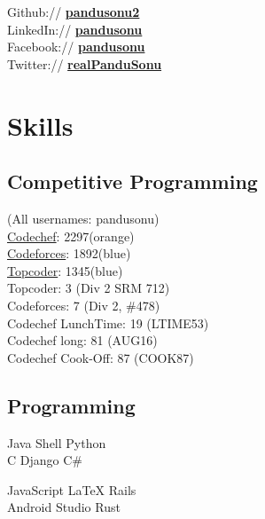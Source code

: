 \documentclass[letterpaper]{deedy-resume} %
\begin{document}
\begin{minipage}[t]{0.33\textwidth}
Github:// \href{https://github.com/pandusonu2}{\bf pandusonu2} \\
LinkedIn:// \href{https://www.linkedin.com/in/pandusonu}{\bf pandusonu} \\
Facebook:// \href{https://www.facebook.com/pandu.sonu}{\bf pandusonu} \\
Twitter:// \href{https://twitter.com/realPanduSonu} {\bf realPanduSonu}

\sectionspace %

\section{Skills}

\sectionspace

\subsection{Competitive Programming}
(All usernames: pandusonu) \\
\href{https://www.codechef.com/users/pandusonu}{Codechef}: 2297(orange)\\
\href{http://codeforces.com/profile/pandusonu}{Codeforces}: 1892(blue) \\
\href{https://www.topcoder.com/members/pandusonu/}{Topcoder}: 1345(blue)\\
Topcoder: 3 (Div 2 SRM 712)\\
Codeforces: 7 (Div 2, \#478)\\
Codechef LunchTime: 19 (LTIME53)\\
Codechef long: 81 (AUG16)\\
Codechef Cook-Off: 87 (COOK87)

\sectionspace

\subsection{Programming}

Java \textbullet{} Shell \textbullet{} Python \textbullet{} \\
C \textbullet{} Django \textbullet{} C\#

JavaScript \textbullet{} \LaTeX \textbullet{} Rails \textbullet{} \\
Android Studio \textbullet{} Rust




\end{minipage} %
\end{document}
